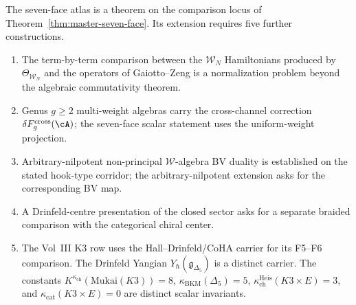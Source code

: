 The seven-face atlas is a theorem on the comparison locus of
Theorem~\ref{thm:master-seven-face}.  Its extension requires five
further constructions.
\begin{enumerate}
\item The term-by-term comparison between the $\mathcal W_N$
Hamiltonians produced by $\Theta_{\mathcal W_N}$ and the operators
of Gaiotto--Zeng is a normalization problem beyond the algebraic
commutativity theorem.
\item Genus $g\geq2$ multi-weight algebras carry the cross-channel
correction
$\delta F_g^{\mathrm{cross}}(\cA)$; the seven-face scalar statement
uses the uniform-weight projection.
\item Arbitrary-nilpotent non-principal $\mathcal W$-algebra
BV duality is established on the stated hook-type corridor; the
arbitrary-nilpotent extension asks for the corresponding BV map.
\item A Drinfeld-centre presentation of the closed sector asks for a
separate braided comparison with the categorical chiral center.
\item The Vol~III K3 row uses the Hall--Drinfeld/CoHA carrier for its
F5--F6 comparison.  The Drinfeld Yangian
$Y_\hbar(\mathfrak g_{\Delta_5})$ is a distinct carrier.  The constants
$K^{\kappa_{\mathrm{ch}}}(\mathrm{Mukai}(K3))=8$,
$\kappa_{\mathrm{BKM}}(\Delta_5)=5$,
$\kappa_{\mathrm{ch}}^{\mathrm{Heis}}(K3\times E)=3$, and
$\kappa_{\mathrm{cat}}(K3\times E)=0$ are distinct scalar invariants.
\end{enumerate}
